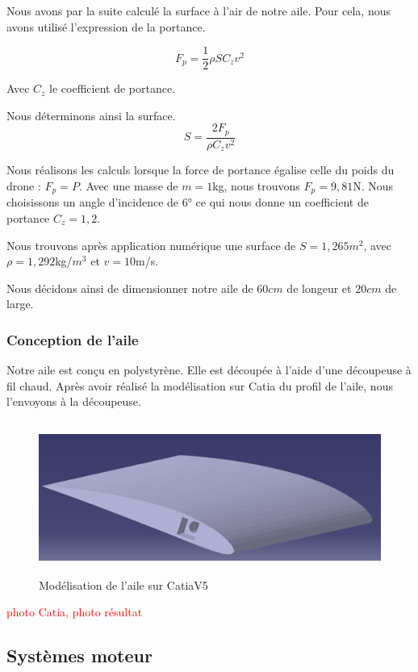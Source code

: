 \documentclass[a4paper,12pt,french]{report}
\begin{document}
Nous avons par la suite calculé la surface à l'air de notre aile. Pour cela, nous avons utilisé l'expression de la portance.

$$ F_p=\frac{1}{2}\rho S C_z v^2$$

Avec $C_z$ le coefficient de portance.

Nous déterminons ainsi la surface.
$$S=\frac{2F_p}{\rho C_z v^2}$$

Nous réalisons les calculs lorsque la force de portance égalise celle du poids du drone : $F_p=P.$ Avec une masse de $m=1$kg, nous trouvons $F_p=9,81$N. Nous choisissons un angle d'incidence de $6°$ ce qui nous donne un coefficient de portance $C_z=1,2$.\newline

Nous trouvons après application numérique une surface de $S=1,265$$m^2$, avec $\rho=1,292$kg/$m^3$ et $v=10$m/s.\newline

    Nous décidons ainsi de dimensionner notre aile de $60cm$ de longeur et $20cm$ de large.

\subsubsection*{Conception de l'aile}

Notre aile est conçu en polystyrène. Elle est découpée à l'aide d'une découpeuse à fil chaud. Après avoir réalisé la modélisation sur Catia du profil de l'aile, nous l'envoyons à la découpeuse.

\begin{figure}[h]
    \centering
    \includegraphics[height=5cm]{figures/ailec.png}
    \caption{Modélisation de l'aile sur CatiaV5}
\end{figure}

\textcolor{red}{photo Catia, photo résultat}

\subsection{Systèmes moteur}
\end{document}
